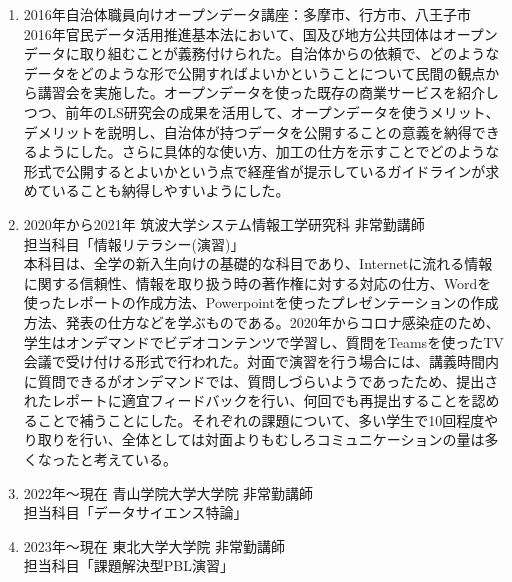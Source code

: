 \documentclass[dvipdfmx]{jlreq}
\begin{document}
\begin{enumerate}
\begin{enumerate}
14の企業から一人づつ参加して半年間研究し、最後に派遣元の企業幹部が集まる場にて成果を発表する研究会。自分はこの研究会にテクニカルアドバイザーとして参加。参加メンバーは、全員オープンデータに興味はあるものの、どういうものかわからないもの、実際に使ってみたことがあるもの、インフラ企業で自社が持つデータをオープンデータとして公開することを検討しているものなど様々な立場から集まっていた。そこで、グループをオープンデータを使う立場と自社のデータをオープンデータとして公開して使ってもらう立場の２つに分けた。前半では、それぞれの立場で既存のデータ、ツール、技術の調査を行った。後半では、企業活動においてオープンデータを利用するメリット、デメリット、自社のデータを公開するメリット、デメリットを議論し、最後に２つのグループが検討した結果を総合して、将来の理想的なオープンデータが流通する状態を描いた。
\item 2016年自治体職員向けオープンデータ講座：多摩市、行方市、八王子市\\
2016年官民データ活用推進基本法において、国及び地方公共団体はオープンデータに取り組むことが義務付けられた。自治体からの依頼で、どのようなデータをどのような形で公開すればよいかということについて民間の観点から講習会を実施した。オープンデータを使った既存の商業サービスを紹介しつつ、前年のLS研究会の成果を活用して、オープンデータを使うメリット、デメリットを説明し、自治体が持つデータを公開することの意義を納得できるようにした。さらに具体的な使い方、加工の仕方を示すことでどのような形式で公開するとよいかという点で経産省が提示しているガイドラインが求めていることも納得しやすいようにした。
\item 2020年から2021年 筑波大学システム情報工学研究科 非常勤講師\\
担当科目「情報リテラシー(演習)」\\
本科目は、全学の新入生向けの基礎的な科目であり、Internetに流れる情報に関する信頼性、情報を取り扱う時の著作権に対する対応の仕方、Wordを使ったレポートの作成方法、Powerpointを使ったプレゼンテーションの作成方法、発表の仕方などを学ぶものである。2020年からコロナ感染症のため、学生はオンデマンドでビデオコンテンツで学習し、質問をTeamsを使ったTV会議で受け付ける形式で行われた。対面で演習を行う場合には、講義時間内に質問できるがオンデマンドでは、質問しづらいようであったため、提出されたレポートに適宜フィードバックを行い、何回でも再提出することを認めることで補うことにした。それぞれの課題について、多い学生で10回程度やり取りを行い、全体としては対面よりもむしろコミュニケーションの量は多くなったと考えている。
\item 2022年〜現在 青山学院大学大学院 非常勤講師\\
担当科目「データサイエンス特論」
\item 2023年〜現在 東北大学大学院 非常勤講師\\
担当科目「課題解決型PBL演習」
\end{enumerate}
\end{enumerate}
\end{document}
